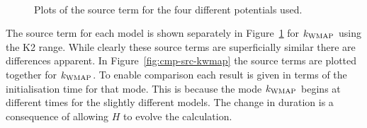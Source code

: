 \begin{figure}[h]
\centering%
\qquad%
\\%
\qquad%
\caption[The source term for different potentials]{Plots of the source term for the
four different potentials used.}
\label{fig:sourcecomparison-res}
\end{figure}
% 
The source term for each model is shown separately in Figure~\ref{fig:sourcecomparison-res} for
$k_\mathrm{WMAP}$ using the K2 range\footnotemark. 
% 
% 
While clearly these source terms are superficially similar
there are differences apparent. In Figure~\ref{fig:cmp-src-kwmap} the source terms are plotted
together for $k_\mathrm{WMAP}$. To enable comparison each result is given in terms of the initialisation time
for that mode. This is because the mode $k_\mathrm{WMAP}$ begins at different times for the slightly
different models. The change in duration is a consequence of allowing $H$ to evolve the
calculation. 

